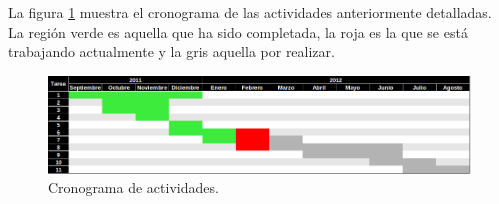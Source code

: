 \documentclass[english]{article}
\begin{document}
La figura \ref{fig:Cronograma-de-actividades} muestra el cronograma de las actividades anteriormente detalladas. La región verde es aquella que ha sido completada, la roja es la que se está trabajando actualmente y la gris aquella por realizar.

\begin{figure}
\includegraphics[scale=0.5]{images/cronograma}
\caption{\label{fig:Cronograma-de-actividades}Cronograma de actividades.}
\end{figure}
\end{document}

